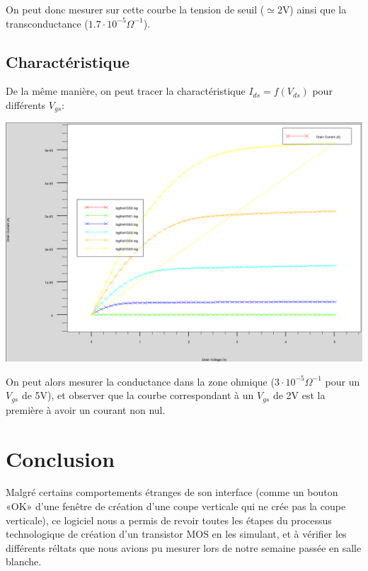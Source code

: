 \documentclass{article}
\begin{document}
On peut donc mesurer sur cette courbe la tension de seuil ($\simeq2$V) ainsi que la transconductance ($1.7\cdot10^{-5}\Omega^{-1}$).

\subsection{Charactéristique}

De la même manière, on peut tracer la charactéristique $I_{ds}=f(V_{ds})$ pour différents $V_{gs}$:

\includegraphics[width=\linewidth]{Id_f_de_VD_pour5VG.png}

On peut alors mesurer la conductance dans la zone ohmique ($3\cdot10^{-5}\Omega^{-1}$ pour un $V_{gs}$ de 5V), et observer que la courbe correspondant à un $V_{gs}$ de 2V est la première à avoir un courant non nul.

\section*{Conclusion}

Malgré certains comportements étranges de son interface (comme un bouton «OK» d’une fenêtre de création d’une coupe verticale qui ne crée pas la coupe verticale), ce logiciel nous a permis de revoir toutes les étapes du processus technologique de création d’un transistor MOS en les simulant, et à vérifier les différents réltats que nous avions pu mesurer lors de notre semaine passée en salle blanche.
\end{document}
